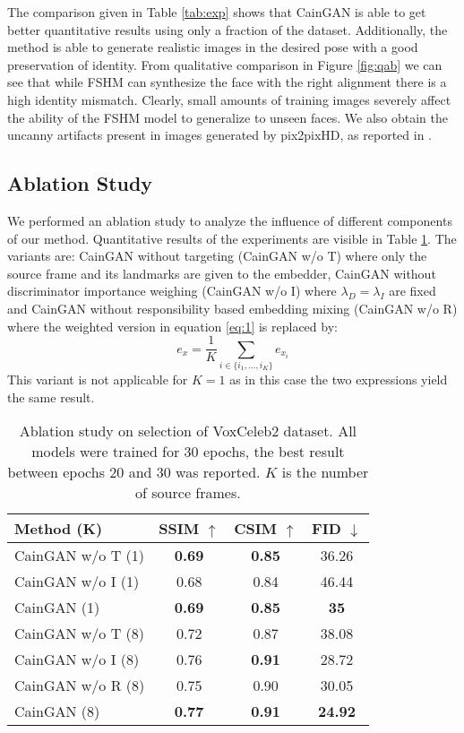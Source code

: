 \documentclass[11pt,a4paper]{article}
\begin{document}
The comparison given in Table \ref{tab:exp} shows that CainGAN is able to get better quantitative results using only a fraction of the dataset. Additionally, the method is able to generate realistic images in the desired pose with a good preservation of identity. From qualitative comparison in Figure \ref{fig:qab} we can see that while FSHM can synthesize the face with the right alignment there is a high identity mismatch. Clearly, small amounts of training images severely affect the ability of the FSHM model to generalize to unseen faces. We also obtain the uncanny artifacts present in images generated by pix2pixHD, as reported in \cite{zakharov2019fewshot}.

\subsection{Ablation Study}
We performed an ablation study to analyze the influence of different components of our method. Quantitative results of the experiments are visible in Table \ref{tab:abl}. The variants are: CainGAN without targeting (CainGAN w/o T) where only the source frame and its landmarks are given to the embedder, CainGAN without discriminator importance weighing (CainGAN w/o I) where $\lambda_D = \lambda_I$ are fixed and CainGAN without responsibility based embedding mixing (CainGAN w/o R) where the weighted version in equation \eqref{eq:1} is replaced by:
\begin{equation}
    e_x = \frac{1}{K}\sum_{i \in \{i_1, \ldots, i_K\}} e_{x_i}
\end{equation}
This variant is not applicable for $K=1$ as in this case the two expressions yield the same result.

\setlength{\tabcolsep}{1em}
\begin{table}[!t]
\centering
\begin{tabular}{l c c c}
     Method (K) & SSIM $\uparrow$ & CSIM $\uparrow$ & FID $\downarrow$ \\
     \hline
     CainGAN w/o T (1) & \textbf{0.69} & \textbf{0.85} & 36.26 \\ 
     CainGAN w/o I (1) & 0.68 & 0.84 & 46.44 \\
     CainGAN (1) & \textbf{0.69} & \textbf{0.85} & \textbf{35} \\
     \hline
     CainGAN w/o T (8) & 0.72 & 0.87 & 38.08 \\ 
     CainGAN w/o I (8) & 0.76 & \textbf{0.91} & 28.72 \\
     CainGAN w/o R (8) & 0.75 & 0.90 & 30.05 \\
     CainGAN (8) & \textbf{0.77} & \textbf{0.91} & \textbf{24.92} \\
     \hline
\end{tabular}
\caption{Ablation study on selection of VoxCeleb2 dataset. All models were trained for 30 epochs, the best result between epochs 20 and 30 was reported. $K$ is the number of source frames.}
\label{tab:abl}
\end{table}
\end{document}
